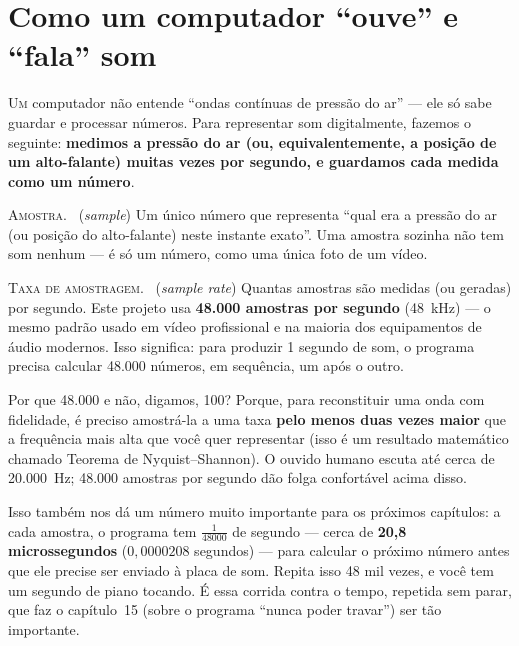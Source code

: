 \documentclass[11pt,oneside]{book}
\newcommand{\nova}[1]{\textsc{\color{accent}#1.}~}
\newcommand{\opening}[2]{\lettrine[lines=2,loversize=0.08,lraise=0.02]{#1}{#2}}
\begin{document}
\chapter{Como um computador \enquote{ouve} e \enquote{fala} som}

\opening{U}{m} computador não entende \enquote{ondas contínuas de pressão
do ar} --- ele só sabe guardar e processar números. Para representar som
digitalmente, fazemos o seguinte: \textbf{medimos a pressão do ar (ou,
equivalentemente, a posição de um alto-falante) muitas vezes por segundo, e
guardamos cada medida como um número}.

\begin{newword}
\nova{Amostra} (\emph{sample}) Um único número que representa \enquote{qual
era a pressão do ar (ou posição do alto-falante) neste instante exato}. Uma
amostra sozinha não tem som nenhum --- é só um número, como uma única foto
de um vídeo.
\end{newword}

\begin{newword}
\nova{Taxa de amostragem} (\emph{sample rate}) Quantas amostras são medidas
(ou geradas) por segundo. Este projeto usa \textbf{48.000 amostras por
segundo} (48~kHz) --- o mesmo padrão usado em vídeo profissional e na
maioria dos equipamentos de áudio modernos. Isso significa: para produzir 1
segundo de som, o programa precisa calcular 48.000 números, em sequência,
um após o outro.
\end{newword}

Por que 48.000 e não, digamos, 100? Porque, para reconstituir uma onda com
fidelidade, é preciso amostrá-la a uma taxa \textbf{pelo menos duas vezes
maior} que a frequência mais alta que você quer representar (isso é um
resultado matemático chamado Teorema de Nyquist--Shannon). O ouvido humano
escuta até cerca de 20.000~Hz; 48.000 amostras por segundo dão folga
confortável acima disso.

Isso também nos dá um número muito importante para os próximos capítulos: a
cada amostra, o programa tem $\frac{1}{48000}$ de segundo --- cerca de
\textbf{20,8 microssegundos} ($0{,}0000208$ segundos) --- para calcular o
próximo número antes que ele precise ser enviado à placa de som. Repita
isso 48 mil vezes, e você tem um segundo de piano tocando. É essa corrida
contra o tempo, repetida sem parar, que faz o capítulo~15 (sobre o programa
\enquote{nunca poder travar}) ser tão importante.
\end{document}
